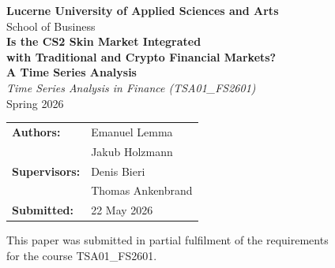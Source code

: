 \documentclass[12pt, a4paper]{article}
\begin{document}
\begin{titlepage}
  \centering
  \vspace*{2cm}

  {\Large \textbf{Lucerne University of Applied Sciences and Arts}}\\[0.4cm]
  {\large School of Business}\\[2cm]

  {\LARGE \textbf{Is the CS2 Skin Market Integrated\\[0.3cm]
  with Traditional and Crypto Financial Markets?\\[0.3cm]
  A Time Series Analysis}}\\[2cm]

  {\large \textit{Time Series Analysis in Finance (TSA01\_FS2601)}}\\[0.5cm]
  {\large Spring 2026}\\[2cm]

  \begin{tabular}{ll}
    \textbf{Authors:}      & Emanuel Lemma \\
                           & Jakub Holzmann \\[0.5cm]
    \textbf{Supervisors:}  & Denis Bieri \\
                           & Thomas Ankenbrand \\[0.5cm]
    \textbf{Submitted:}    & 22 May 2026 \\
  \end{tabular}

  \vfill
  {\small This paper was submitted in partial fulfilment of the requirements\\
  for the course TSA01\_FS2601.}
\end{titlepage}

\newpage
\begin{abstract}
\noindent
This paper examines whether the CS2 skin market --- a multi-billion-dollar
virtual goods market operating through the Steam Marketplace --- is integrated
with traditional and crypto financial markets. We construct a daily
value-weighted price index from 1,607 liquid CS2 skins over the period August
2013 to June 2024 and test for market integration against the S\&P 500,
Bitcoin, and Gold using exploratory data analysis, GARCH(1,1) volatility
modelling, and a VAR(4) model with Granger causality tests. We find no evidence
of market integration: contemporaneous correlations between CS2 returns and all
three comparison assets are indistinguishable from zero, and no Granger causal
relationship is detected in either direction at the 5\% significance level.
CS2 exhibits extreme annualised volatility (114.56\%) and GARCH persistence
identical to Bitcoin (0.9990), but its price dynamics are driven by
game-specific factors rather than macroeconomic forces. These results position
CS2 skins as a genuinely segmented alternative asset class with potential
diversification benefits for financial investors.
\end{abstract}
\end{document}
